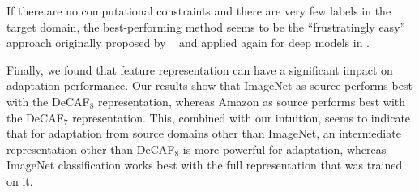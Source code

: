 If there are no computational constraints and there are very few labels in
the target domain, the best-performing method seems to be the ``frustratingly
easy'' approach originally proposed by \daume~\cite{daume} and applied again for
deep models in \cite{ref:dlid}.

Finally, we found that feature representation can have a significant impact on
adaptation performance. Our results show that ImageNet as source performs best
with the DeCAF$_8$ representation, whereas Amazon as source performs best with
the DeCAF$_7$ representation. This, combined with our intuition, seems to
indicate that for adaptation from source domains other than ImageNet, an
intermediate representation other than DeCAF$_8$ is more powerful for
adaptation, whereas ImageNet classification works best with the full representation that
was trained on it.
